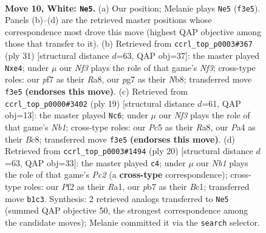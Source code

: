 \documentclass[11pt]{article}
\begin{document}
\clearpage

\begin{figure}[p]\centering
\begin{subfigure}{0.46\textwidth}\centering
\resizebox{\linewidth}{!}{%
\newchessgame
\chessboard[
  setfen={rn1k1b1r/1p3ppp/p1b1pn2/2P5/P1B5/4PN2/1P3PPP/RNB2RK1 w - - 0 10},
  showmover=false,
  pgfstyle=straightmove, color=movearrow, markmove={f3-e5}
]}
\caption{}
\end{subfigure}\hfill
\begin{subfigure}{0.46\textwidth}\centering
\resizebox{\linewidth}{!}{%
\newchessgame
\chessboard[
  setfen={rn3rk1/4bppp/p3pn2/1p6/3BN3/P4PP1/1P3P1P/2R1KB1R b K - 4 16},
  showmover=false,
  pgfstyle=straightmove, color=movearrow, markmove={f6-e4}
]}
\caption{}
\end{subfigure}
\\[4pt]
\begin{subfigure}{0.46\textwidth}\centering
\resizebox{\linewidth}{!}{%
\newchessgame
\chessboard[
  setfen={rnb2rk1/2B1ppbp/p4np1/1p6/3PP3/2N5/PP2BPPP/R3K1NR b KQ - 0 10},
  showmover=false,
  pgfstyle=straightmove, color=movearrow, markmove={b8-c6}
]}
\caption{}
\end{subfigure}\hfill
\begin{subfigure}{0.46\textwidth}\centering
\resizebox{\linewidth}{!}{%
\newchessgame
\chessboard[
  setfen={rn2kb1r/1b3ppp/p3pn2/1pP5/8/1B3N1P/PPP2PP1/R1BNK2R w KQkq - 0 11},
  showmover=false,
  pgfstyle=straightmove, color=movearrow, markmove={c2-c4}
]}
\caption{}
\end{subfigure}
\caption{\textbf{Move 10, White: \texttt{Ne5}.} (a) Our position; Melanie plays \texttt{Ne5} (\texttt{f3e5}). Panels (b)--(d) are the retrieved master positions whose correspondence most drove this move (highest QAP objective among those that transfer to it). (b) Retrieved from \texttt{ccrl\_top\_p0003\#367} (ply 31) [structural distance $d$=63, QAP obj=37]: the master played \texttt{Nxe4}; under $\mu$ our \emph{Nf3} plays the role of that game's \emph{Nf3}; cross-type roles: our \emph{p}f7 as their \emph{R}a8, our \emph{p}g7 as their \emph{N}b8; transferred move \texttt{f3e5} \textbf{(endorses this move)}. (c) Retrieved from \texttt{ccrl\_top\_p0000\#3402} (ply 19) [structural distance $d$=61, QAP obj=13]: the master played \texttt{Nc6}; under $\mu$ our \emph{Nf3} plays the role of that game's \emph{Nb1}; cross-type roles: our \emph{P}c5 as their \emph{R}a8, our \emph{P}a4 as their \emph{B}c8; transferred move \texttt{f3e5} \textbf{(endorses this move)}. (d) Retrieved from \texttt{ccrl\_top\_p0003\#1494} (ply 20) [structural distance $d$=63, QAP obj=33]: the master played \texttt{c4}; under $\mu$ our \emph{Nb1} plays the role of that game's \emph{Pc2} (a \textbf{cross-type} correspondence); cross-type roles: our \emph{P}f2 as their \emph{R}a1, our \emph{p}b7 as their \emph{B}c1; transferred move \texttt{b1c3}. Synthesis: 2 retrieved analogs transferred to \texttt{Ne5} (summed QAP objective 50, the strongest correspondence among the candidate moves); Melanie committed it via the \texttt{search} selector.}
\label{fig:thought-m18}
\end{figure}
\end{document}
